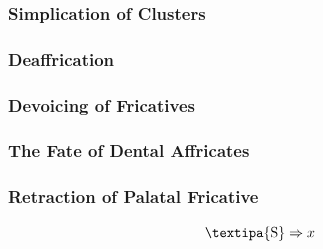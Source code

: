 \documentclass{report}[12pt]
\begin{document}
\subsubsection*{Simplication of Clusters}

\begin{tcolorbox}
  
\end{tcolorbox}

\subsubsection*{Deaffrication}

\begin{tcolorbox}

\end{tcolorbox}

\subsubsection*{Devoicing of Fricatives}

\begin{tcolorbox}
  
\end{tcolorbox}

\subsubsection*{The Fate of Dental Affricates}

\begin{tcolorbox}

\end{tcolorbox}

\subsubsection*{Retraction of Palatal Fricative}

\begin{tcolorbox}
  \[ \text{\textipa{S}} \Rightarrow x \]  
\end{tcolorbox}

\end{document}
